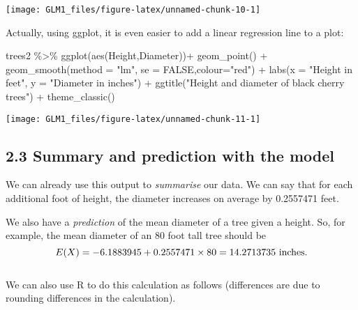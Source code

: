 \documentclass[
]{article}
\newenvironment{Shaded}{\begin{snugshade}}{\end{snugshade}}
\newcommand{\AttributeTok}[1]{\textcolor[rgb]{0.77,0.63,0.00}{#1}}
\newcommand{\ConstantTok}[1]{\textcolor[rgb]{0.00,0.00,0.00}{#1}}
\newcommand{\FunctionTok}[1]{\textcolor[rgb]{0.00,0.00,0.00}{#1}}
\newcommand{\NormalTok}[1]{#1}
\newcommand{\SpecialCharTok}[1]{\textcolor[rgb]{0.00,0.00,0.00}{#1}}
\newcommand{\StringTok}[1]{\textcolor[rgb]{0.31,0.60,0.02}{#1}}
\begin{document}
\begin{center}\texttt{[image: GLM1\_files/figure-latex/unnamed-chunk-10-1]} \end{center}

Actually, using ggplot, it is even easier to add a linear regression
line to a plot:

\begin{Shaded}
\begin{Highlighting}[]
\NormalTok{trees2 }\SpecialCharTok{\%\textgreater{}\%} \FunctionTok{ggplot}\NormalTok{(}\FunctionTok{aes}\NormalTok{(Height,Diameter))}\SpecialCharTok{+}
      \FunctionTok{geom\_point}\NormalTok{() }\SpecialCharTok{+}
      \FunctionTok{geom\_smooth}\NormalTok{(}\AttributeTok{method =} \StringTok{"lm"}\NormalTok{, }\AttributeTok{se =} \ConstantTok{FALSE}\NormalTok{,}\AttributeTok{colour=}\StringTok{"red"}\NormalTok{) }\SpecialCharTok{+}
      \FunctionTok{labs}\NormalTok{(}\AttributeTok{x =} \StringTok{"Height in feet"}\NormalTok{, }\AttributeTok{y =} \StringTok{"Diameter in inches"}\NormalTok{) }\SpecialCharTok{+}
      \FunctionTok{ggtitle}\NormalTok{(}\StringTok{"Height and diameter of black cherry trees"}\NormalTok{) }\SpecialCharTok{+}
      \FunctionTok{theme\_classic}\NormalTok{()}
\end{Highlighting}
\end{Shaded}

\begin{center}\texttt{[image: GLM1\_files/figure-latex/unnamed-chunk-11-1]} \end{center}

\hypertarget{summary-and-prediction-with-the-model}{%
\subsection{2.3 Summary and prediction with the
model}\label{summary-and-prediction-with-the-model}}

We can already use this output to \emph{summarise} our data. We can say
that for each additional foot of height, the diameter increases on
average by 0.2557471 feet.

We also have a \emph{prediction} of the mean diameter of a tree given a
height. So, for example, the mean diameter of an 80 foot tall tree
should be \[
E(X) =-6.1883945 + 0.2557471\times  80 = 14.2713735 \,\, {\rm   inches.}
\]\\
We can also use R to do this calculation as follows (differences are due
to rounding differences in the calculation).
\end{document}
